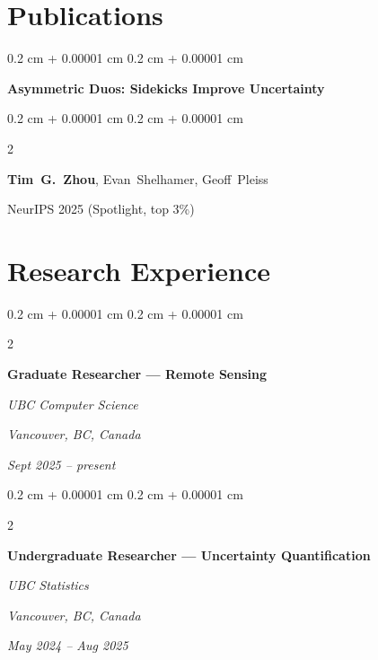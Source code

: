 \documentclass[10pt, letterpaper]{article}
\newenvironment{onecolentry}{
    \begin{adjustwidth}{
        0.2 cm + 0.00001 cm
    }{
        0.2 cm + 0.00001 cm
    }
}{
    \end{adjustwidth}
} %
\newenvironment{twocolentry}[2][]{
    \onecolentry
    \def\secondColumn{#2}
    \setcolumnwidth{\fill, 4.5 cm}
    \begin{paracol}{2}
}{
    \switchcolumn \raggedleft \secondColumn
    \end{paracol}
    \endonecolentry
} %
\newenvironment{widetwocolentry}[2][]{
    \onecolentry
    \def\secondColumn{#2}
    \setcolumnwidth{\fill, 6.5 cm}
    \begin{paracol}{2}
}{
    \switchcolumn \raggedleft \secondColumn
    \end{paracol}
    \endonecolentry
} %
\begin{document}
    
    \section{Publications}



        
        \begin{samepage}
            \begin{onecolentry}
                \textbf{Asymmetric Duos: Sidekicks Improve Uncertainty}
            \end{onecolentry}

            \vspace{0.10 cm}

            \begin{widetwocolentry}{
                NeurIPS 2025 (Spotlight, top 3\%)
            }
                \mbox{\textbf{Tim G. Zhou}}, \mbox{Evan Shelhamer}, \mbox{Geoff Pleiss}
            \end{widetwocolentry}
        \end{samepage}


    
    \section{Research Experience}



        
        \begin{twocolentry}{
        \textit{Vancouver, BC, Canada}    
            
        \textit{Sept 2025 – present}}
            \textbf{Graduate Researcher — Remote Sensing}
            
            \textit{UBC Computer Science}

        \end{twocolentry}



        \vspace{0.2 cm}

        \begin{twocolentry}{
        \textit{Vancouver, BC, Canada}    
            
        \textit{May 2024 – Aug 2025}}
            \textbf{Undergraduate Researcher — Uncertainty Quantification}
            
            \textit{UBC Statistics}

        \end{twocolentry}
\end{document}
